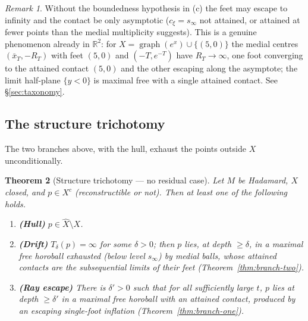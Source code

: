 \documentclass[11pt]{article}
\newtheorem{theorem}{Theorem}[section]
\theoremstyle{remark}
\newtheorem{remark}[theorem]{Remark}
\newcommand{\R}{\mathbb{R}}
\newcommand{\X}{X}
\newcommand{\Xhat}{\widehat{\X}}
\begin{document}
\begin{remark}\label{rem:escape-feet}
Without the boundedness hypothesis in (c) the feet may escape to
infinity and the contact be only asymptotic
($c_{\xi}=s_{\infty}$ not attained, or attained at fewer points than
the medial multiplicity suggests). This is a genuine phenomenon
already in $\R^{2}$: for
$\X=\operatorname{graph}(e^{x})\cup\{(5,0)\}$ the medial centres
$(\bar x_{T},-R_{T})$ with feet $(5,0)$ and
$(-T,e^{-T})$ have $R_{T}\to\infty$, one foot converging to the
attained contact $(5,0)$ and the other escaping along the asymptote;
the limit half-plane $\{y<0\}$ is maximal free with a single attained
contact. See \S\ref{sec:taxonomy}.
\end{remark}

\subsection{The structure trichotomy}\label{sec:structure}

The two branches above, with the hull, exhaust the
points outside $\X$ unconditionally.

\begin{theorem}[Structure trichotomy --- no residual case]
\label{thm:structure}
Let $M$ be Hadamard, $\X$ closed, and $p\in\X^{c}$ (reconstructible
or not). Then at least one of the following holds.
\begin{enumerate}[label=(\Roman*)]
\item \textbf{(Hull)} $p\in\Xhat\setminus\X$.
\item \textbf{(Drift)} $T_{\delta}(p)=\infty$ for some $\delta>0$;
then $p$ lies, at depth $\ge\delta$, in a maximal free horoball
exhausted (below level $s_{\infty}$) by medial balls, whose attained
contacts are the subsequential limits of their feet
(Theorem~\ref{thm:branch-two}).
\item \textbf{(Ray escape)} There is $\delta'>0$ such that for all
sufficiently large $t$, $p$ lies at depth $\ge\delta'$ in a maximal
free horoball with an attained contact, produced by an escaping
single-foot inflation (Theorem~\ref{thm:branch-one}).
\end{enumerate}
\end{theorem}
\end{document}
